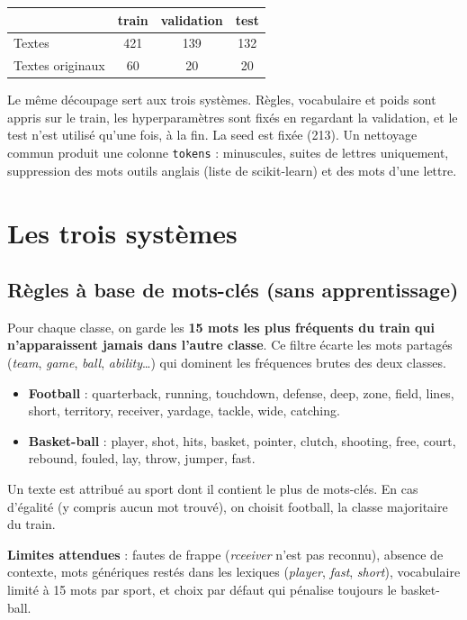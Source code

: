\documentclass[11pt,a4paper]{article}
\begin{document}
\begin{center}
\begin{tabular}{lccc}
\toprule
 & train & validation & test \\
\midrule
Textes & 421 & 139 & 132 \\
Textes originaux & 60 & 20 & 20 \\
\bottomrule
\end{tabular}
\end{center}

Le même découpage sert aux trois systèmes. Règles, vocabulaire et poids sont appris sur le train, les hyperparamètres sont fixés en regardant la validation, et le test n'est utilisé qu'une fois, à la fin. La seed est fixée (213). Un nettoyage commun produit une colonne \texttt{tokens} : minuscules, suites de lettres uniquement, suppression des mots outils anglais (liste de scikit-learn) et des mots d'une lettre.

\section{Les trois systèmes}

\subsection{Règles à base de mots-clés (sans apprentissage)}

Pour chaque classe, on garde les \textbf{15 mots les plus fréquents du train qui n'apparaissent jamais dans l'autre classe}. Ce filtre écarte les mots partagés (\emph{team}, \emph{game}, \emph{ball}, \emph{ability}\ldots) qui dominent les fréquences brutes des deux classes.

\begin{itemize}
  \item \textbf{Football} : quarterback, running, touchdown, defense, deep, zone, field, lines, short, territory, receiver, yardage, tackle, wide, catching.
  \item \textbf{Basket-ball} : player, shot, hits, basket, pointer, clutch, shooting, free, court, rebound, fouled, lay, throw, jumper, fast.
\end{itemize}

Un texte est attribué au sport dont il contient le plus de mots-clés. En cas d'égalité (y compris aucun mot trouvé), on choisit football, la classe majoritaire du train.

\textbf{Limites attendues} : fautes de frappe (\emph{rceeiver} n'est pas reconnu), absence de contexte, mots génériques restés dans les lexiques (\emph{player}, \emph{fast}, \emph{short}), vocabulaire limité à 15 mots par sport, et choix par défaut qui pénalise toujours le basket-ball.
\end{document}
